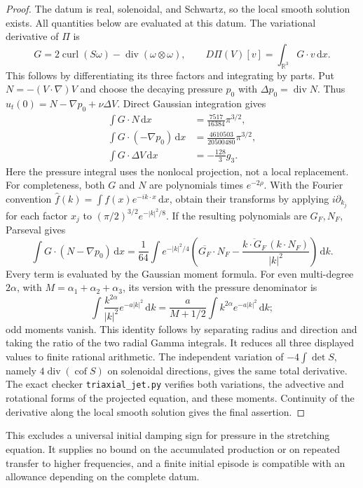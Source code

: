 \documentclass[11pt]{article}
\theoremstyle{remark}
\newcommand{\R}{\mathbb R}
\newcommand{\dd}{\,\mathrm d}
\newcommand{\curl}{\operatorname{curl}}
\newcommand{\diver}{\operatorname{div}}
\begin{document}
\begin{proof}
The datum is real, solenoidal, and Schwartz, so the local smooth solution
exists. All quantities below are evaluated at this datum.
The variational derivative of $\Pi$ is
\[
 G=2\curl(S\omega)-\diver(\omega\otimes\omega),\qquad
 D\Pi(V)[v]=\int_{\R^3}G\cdot v\dd x.
\]
This follows by differentiating its three factors and integrating by
parts. Put $N=-(V\cdot\nabla)V$ and choose the decaying pressure $p_0$
with $\Delta p_0=\diver N$. Thus
$u_t(0)=N-\nabla p_0+\nu\Delta V$.
Direct Gaussian integration gives
\begin{align*}
 \int G\cdot N\dd x&=\frac{7517}{16384}\pi^{3/2},\\
 \int G\cdot(-\nabla p_0)\dd x
      &=\frac{4610503}{20500480}\pi^{3/2},\\
 \int G\cdot\Delta V\dd x&=-\frac{128}{3}g_3.
\end{align*}
Here the pressure integral uses the nonlocal projection, not a local
replacement. For completeness, both $G$ and $N$ are polynomials times
$e^{-2\rho}$. With the Fourier convention
$\widehat f(k)=\int f(x)e^{-ik\cdot x}\dd x$, obtain their transforms
by applying $i\partial_{k_j}$ for each factor $x_j$ to
$(\pi/2)^{3/2}e^{-|k|^2/8}$.
If the resulting polynomials are $G_F,N_F$, Parseval gives
\[
 \int G\cdot(N-\nabla p_0)\dd x
 =\frac1{64}\int e^{-|k|^2/4}
 \left(\overline{G_F}\cdot N_F
       -\frac{\overline{k\cdot G_F}\,(k\cdot N_F)}{|k|^2}\right)\dd k.
\]
Every term is evaluated by the Gaussian moment formula. For even
multi-degree $2\alpha$, with $M=\alpha_1+\alpha_2+\alpha_3$, its
version with the pressure denominator is
\[
 \int\frac{k^{2\alpha}}{|k|^2}e^{-a|k|^2}\dd k
   =\frac{a}{M+1/2}\int k^{2\alpha}e^{-a|k|^2}\dd k;
\]
odd moments vanish. This identity follows by separating radius and
direction and taking the ratio of the two radial Gamma integrals.
It reduces all three displayed values to finite rational arithmetic.
The independent variation of $-4\int\det S$, namely
$4\diver(\operatorname{cof}S)$ on solenoidal directions, gives the same
total derivative. The exact checker \texttt{triaxial\_jet.py} verifies
both variations, the advective and rotational forms of the projected
equation, and these moments. Continuity of the derivative along the
local smooth solution gives the final assertion.
\end{proof}

This excludes a universal initial damping sign for pressure in the
stretching equation. It supplies no bound on the accumulated production
or on repeated transfer to higher frequencies, and a finite initial
episode is compatible with an allowance depending on the complete datum.
\end{document}
